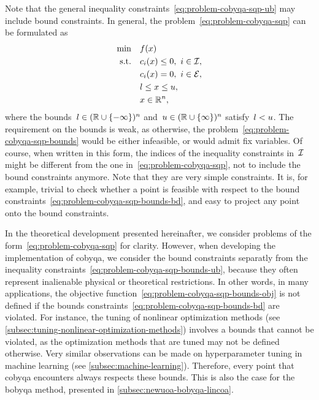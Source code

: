 Note that the general inequality constraints~\cref{eq:problem-cobyqa-sqp-ub} may include bound constraints.
In general, the problem~\cref{eq:problem-cobyqa-sqp} can be formulated as
\begin{subequations}
    \label{eq:problem-cobyqa-bounds}
    \begin{align}
        \min        & \quad \obj(\iter) \label{eq:problem-cobyqa-bounds-obj}\\
        \text{s.t.} & \quad \con{i}(\iter) \le 0, ~ i \in \iub, \label{eq:problem-cobyqa-bounds-ub}\\
                    & \quad \con{i}(\iter) = 0, ~ i \in \ieq,\\
                    & \quad \xl \le x \le \xu, \label{eq:problem-cobyqa-bounds-bd}\\
                    & \quad \iter \in \R^n, \nonumber
    \end{align}
\end{subequations}
where the bounds~$l \in (\mathbb{R} \cup \{-\infty\})^n$ and~$u \in (\mathbb{R} \cup \{\infty\})^n$ satisfy~$l < u$.
The requirement on the bounds is weak, as otherwise, the problem~\cref{eq:problem-cobyqa-sqp-bounds} would be either infeasible, or would admit fix variables.
Of course, when written in this form, the indices of the inequality constraints in~$\mathcal{I}$ might be different from the one in~\cref{eq:problem-cobyqa-sqp}, not to include the bound constraints anymore.
Note that they are very simple constraints.
It is, for example, trivial to check whether a point is feasible with respect to the bound constraints~\cref{eq:problem-cobyqa-sqp-bounds-bd}, and easy to project any point onto the bound constraints.

In the theoretical development presented hereinafter, we consider problems of the form~\cref{eq:problem-cobyqa-sqp} for clarity.
However, when developing the implementation of \gls{cobyqa}, we consider the bound constraints separatly from the inequality constraints~\cref{eq:problem-cobyqa-sqp-bounds-ub}, because they often represent inalienable physical or theoretical restrictions.
In other words, in many applications, the objective function~\cref{eq:problem-cobyqa-sqp-bounds-obj} is not defined if the bounds constraints~\cref{eq:problem-cobyqa-sqp-bounds-bd} are violated.
For instance, the tuning of nonlinear optimization methods (see \cref{subsec:tuning-nonlinear-optimization-methods}) involves a bounds that cannot be violated, as the optimization methods that are tuned may not be defined otherwise.
Very similar observations can be made on hyperparameter tuning in machine learning (see \cref{subsec:machine-learning}).
Therefore, every point that \gls{cobyqa} encounters always respects these bounds.
This is also the case for the \gls{bobyqa} method, presented in \cref{subsec:newuoa-bobyqa-lincoa}.

